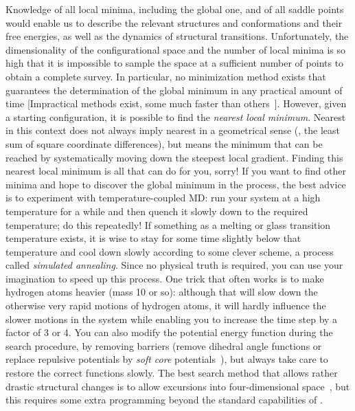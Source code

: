 Knowledge of all local minima, including the global one, and of all
saddle points would enable us to describe the relevant structures and
conformations and their free energies, as well as the dynamics of
structural transitions. Unfortunately, the dimensionality of the
configurational space and the number of local minima is so high that
it is impossible to sample the space at a sufficient number of points
to obtain a complete survey. In particular, no minimization method
exists that guarantees the determination of the global minimum in any
practical amount of time [Impractical methods exist, some much faster
than others~\cite{Geman84}].  However, given a starting configuration,
it is possible to find the {\em nearest local minimum}. Nearest in
this context does not always imply nearest in a geometrical sense
({\ie}, the least sum of square coordinate differences), but means the
minimum that can be reached by systematically moving down the steepest
local gradient. Finding this nearest local minimum is all that
{\gromacs} can do for you, sorry! If you want to find other minima and
hope to discover the global minimum in the process, the best advice is
to experiment with temperature-coupled MD: run your system at a high
temperature for a while and then quench it slowly down to the required
temperature; do this repeatedly!  If something as a melting or glass
transition temperature exists, it is wise to stay for some time
slightly below that temperature and cool down slowly according to some
clever scheme, a process called {\em simulated annealing}. Since no
physical truth is required, you can use your imagination to speed up this
process. One trick that often works is to make hydrogen atoms heavier
(mass 10 or so): although that will slow down the otherwise very rapid
motions of hydrogen atoms, it will hardly influence the slower motions
in the system while enabling you to increase the time step by a factor
of 3 or 4. You can also modify the potential energy function during
the search procedure, {\eg} by removing barriers (remove dihedral
angle functions or replace repulsive potentials by {\em soft core}
potentials~\cite{Nilges88}), but always take care to restore the
correct functions slowly. The best search method that allows rather
drastic structural changes is to allow excursions into
four-dimensional space~\cite{Schaik93}, but this requires some extra
programming beyond the standard capabilities of {\gromacs}.

